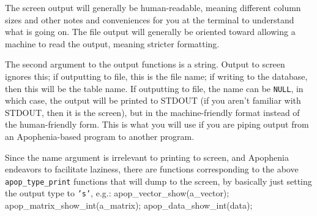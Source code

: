 The screen output will generally be human-readable, meaning different
column sizes and other notes and conveniences for you at the terminal to
understand what is going on.
The file output will generally be oriented toward allowing a machine to
read the output, meaning stricter formatting. 

The second argument to the output functions is a string.  Output to
screen ignores this; if outputting to file, this is the file name;
if writing to the database, then this will be the table name.
If outputting to file, the name can be {\tt NULL}, in which case, the
output will be printed to STDOUT (if you aren't familiar with STDOUT,
then it is the screen), but in the machine-friendly format instead of
the human-friendly form. This is what you will use if you are piping
output from an Apophenia-based program to another program.

Since the name argument is irrelevant to printing to screen, and
Apophenia endeavors to facilitate laziness, there are functions
corresponding to the above {\tt apop\_type\_print} functions that will
dump to the screen, by basically just setting the output type to {\tt 's'}, e.g.:
 
 
 
apop_vector_show(a_vector);
apop_matrix_show_int(a_matrix);
apop_data_show_int(data);
